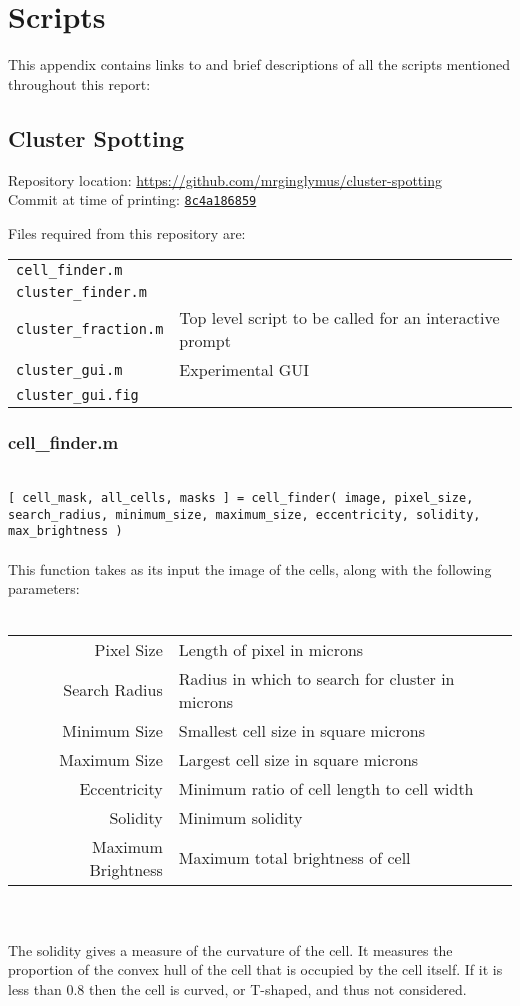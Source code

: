 \documentclass[../main.tex]{subfiles}
\begin{document}
\section{Scripts}
\label{sec:scripts}
This appendix contains links to and brief descriptions of all the scripts mentioned throughout this report:

\subsection{Cluster Spotting}
\label{sec:scripts:clusters}
Repository location: \url{https://github.com/mrginglymus/cluster-spotting}\\
Commit at time of printing: \href{https://github.com/mrginglymus/cluster-spotting/tree/8c4a1868594707eb2215a4a49fbc1fe8dbecb600}{\texttt{8c4a186859}}

Files required from this repository are:


\begin{tabular}{ll}
\texttt{cell\_finder.m}	&	\\
\texttt{cluster\_finder.m}	&	\\
\texttt{cluster\_fraction.m}	&	Top level script to be called for an interactive prompt	\\
\texttt{cluster\_gui.m}		&	Experimental GUI \\
\texttt{cluster\_gui.fig}	&	
\end{tabular}

\subsubsection{cell\_finder.m}\ \\
\texttt{[ cell\_mask, all\_cells, masks ] = cell\_finder( image, pixel\_size, search\_radius, minimum\_size, maximum\_size, eccentricity, solidity, max\_brightness ) }
\\\\
This function takes as its input the image of the cells, along with the following parameters:
\\\\
\begin{tabular}{rl}
Pixel Size		&	Length of pixel in microns\\
Search Radius 	&	Radius in which to search for cluster in microns\\
Minimum Size		&	Smallest cell size in square microns\\
Maximum Size		&	Largest cell size in square microns\\
Eccentricity		&	Minimum ratio of cell length to cell width\\
Solidity			&	Minimum solidity\\
Maximum Brightness	&	Maximum total brightness of cell
\end{tabular}
\\\\
The solidity gives a measure of the curvature of the cell. It measures the proportion of the convex hull of the cell that is occupied by the cell itself. If it is less than 0.8 then the cell is curved, or T-shaped, and thus not considered.
\end{document}
